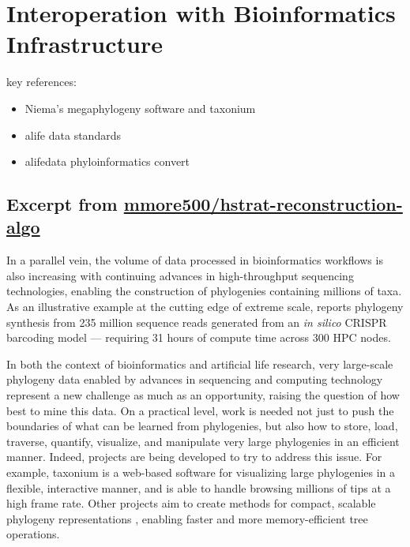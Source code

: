 \section{Interoperation with Bioinformatics Infrastructure}
\label{sec:interoperation}

key references:
\begin{itemize}
\item Niema's megaphylogeny software \citep{moshiri2025compacttree, moshiri2020treeswift} and taxonium \citep{sanderson2022taxonium}
\item alife data standards \citep{lalejini2019data}
\item alifedata phyloinformatics convert \citep{moreno2024apc}
\end{itemize}

\subsection{Excerpt from \href{https://github.com/mmore500/hstrat-reconstruction-algo/}{mmore500/hstrat-reconstruction-algo}}

In a parallel vein, the volume of data processed in bioinformatics workflows is also increasing with continuing advances in high-throughput sequencing technologies, enabling the construction of phylogenies containing millions of taxa.
As an illustrative example at the cutting edge of extreme scale, \citet{konno2022deep} reports phylogeny synthesis from 235 million sequence reads generated from an \textit{in silico} CRISPR barcoding model --- requiring 31 hours of compute time across 300 HPC nodes.

In both the context of bioinformatics and artificial life research, very large-scale phylogeny data enabled by advances in sequencing and computing technology represent a new challenge as much as an opportunity, raising the question of how best to mine this data.
On a practical level, work is needed not just to push the boundaries of what can be learned from phylogenies, but also how to store, load, traverse, quantify, visualize, and manipulate very large phylogenies in an efficient manner.
Indeed, projects are being developed to try to address this issue.
For example, taxonium \citep{sanderson2022taxonium} is a web-based software for visualizing large phylogenies in a flexible, interactive manner, and is able to handle browsing millions of tips at a high frame rate.
Other projects aim to create methods for compact, scalable phylogeny representations \citep{moshiri2025compacttree, moshiri2020treeswift}, enabling faster and more memory-efficient tree operations.

